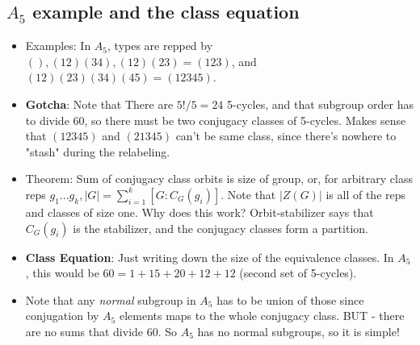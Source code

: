 \documentclass[11pt, oneside]{article}   	%
\begin{document}
\subsection{$A_5$ example and the class equation}
\begin{itemize}

\item Examples: In $A_5$, types are repped by $(), (12)(34), (12)(23) = (123)$, and $ (12)(23)(34)(45) = (12345)$.  
\item \textbf{Gotcha}: Note that There are $5! / 5 = 24$ 5-cycles, and that subgroup order has to divide 60, so there must be two conjugacy classes of 5-cycles.  Makes sense that $(12345)$ and $(21345)$ can't be same class, since there's nowhere to "stash" during the relabeling.
\item Theorem: Sum of conjugacy class orbits is size of group, or, for arbitrary class reps $g_1...g_k, |G| = \sum_{i=1}^k [G:C_G(g_i)]$.  Note that $|Z(G)|$ is all of the reps and classes of size one.  Why does this work?  Orbit-stabilizer says that $C_G(g_i)$ is the stabilizer, and the conjugacy classes form a partition.
\item \textbf{Class Equation}: Just writing down the size of the equivalence classes.  In $A_5$, this would be $60 = 1 + 15 + 20 + 12 + 12$ (second set of 5-cycles).
\item Note that any \emph{normal} subgroup in $A_5$ has to be union of those since conjugation by $A_5$ elements maps to the whole conjugacy class.  BUT - there are no sums that divide 60.  So $A_5$ has no normal subgroups, so it is simple!
\end{itemize}
\end{document}
